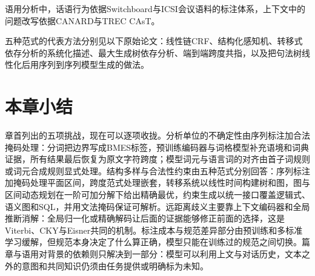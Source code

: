 \begin{fullwidth}
\raggedright
\small
{}\par\medskip
{}\par\medskip
{}\par\medskip
{}\par\medskip
{}
\end{fullwidth}

语用分析中，话语行为依据Switchboard与ICSI会议语料的标注体系，上下文中的问题改写依据CANARD与TREC CAsT。

\begin{fullwidth}
\raggedright
\small
{}\par\medskip
{}\par\medskip
{}\par\medskip
{}
\end{fullwidth}

五种范式的代表方法分别见以下原始论文：线性链CRF、结构化感知机、转移式依存分析的系统化描述、最大生成树依存分析、端到端跨度共指，以及把句法树线性化后用序列到序列模型生成的做法。

\begin{fullwidth}
\raggedright
\small
{}\par\medskip
{}\par\medskip
{}\par\medskip
{}\par\medskip
{}\par\medskip
{}
\end{fullwidth}

\section{本章小结}
\label{sec:nlp-analysis-summary}

章首列出的五项挑战，现在可以逐项收拢。分析单位的不确定性由序列标注加合法掩码处理：分词把边界写成BMES标签，预训练编码器与词格模型补充语境和词典证据，所有结果最后恢复为原文字符跨度；模型词元与语言词的对齐由首子词规则或词元合成规则显式处理。结构多样与合法性约束由五种范式分别回答：序列标注加掩码处理平面区间，跨度范式处理嵌套，转移系统以线性时间构建树和图，图与区间动态规划在一阶可加分解下给出精确最优，约束生成以统一接口覆盖逻辑式、语义图和SQL，并用文法掩码保证可解析。远距离歧义主要靠上下文编码器和全局推断消解：全局归一化或精确解码让后面的证据能够修正前面的选择，这是Viterbi、CKY与Eisner共同的机制。标注成本与规范差异部分由预训练和多标准学习缓解，但规范本身决定了什么算正确，模型只能在训练过的规范之间切换。篇章与语用对背景的依赖则只解决到一部分：模型可以利用上文与对话历史，文本之外的意图和共同知识仍须由任务提供或明确标为未知。

